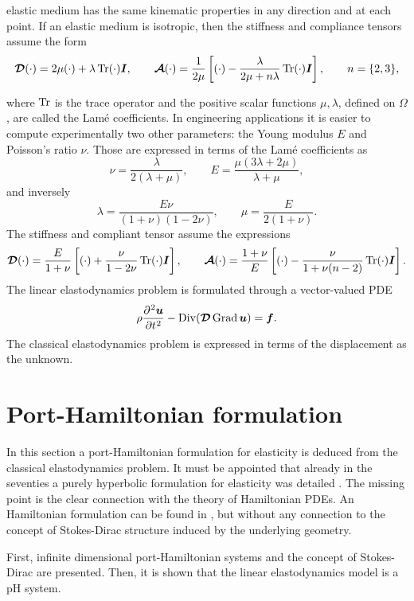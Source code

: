 elastic medium has the same kinematic properties in any direction and at each point. If an elastic medium is isotropic, then the stiffness and compliance tensors assume the form
\[
\bm{\mathcal{D}}(\cdot) = 2\mu (\cdot) + \lambda \operatorname{Tr}(\cdot)\bm{I}, \qquad \bm{\mathcal{A}}(\cdot) = \frac{1}{2\mu}\left[(\cdot) - \frac{\lambda}{2\mu + n\lambda}\operatorname{Tr}(\cdot)\bm{I}\right], \qquad n= \{2,3\},
\]

where  $\operatorname{Tr}$ is the trace operator and the positive scalar functions $\mu, \lambda$, defined on $\Omega$, are called the Lam\'e coefficients. In engineering applications it is easier to compute experimentally two other parameters: the Young modulus $E$ and  Poisson's ratio $\nu$. Those are expressed in terms of the Lam\'e  coefficients as 
\[
\nu =\frac{\lambda}{2(\lambda +\mu)}, \qquad 
E=\frac{\mu (3\lambda +2\mu)}{\lambda +\mu},
\]
and inversely
\[
\lambda =\frac {E\nu }{(1+\nu )(1-2\nu )}, \qquad
\mu = \frac{E}{2(1+\nu)}.
\]
The stiffness and compliant tensor assume the expressions
\[
\bm{\mathcal{D}}(\cdot) = \frac{E}{1+\nu} \left[(\cdot) + \frac{\nu}{1-2\nu}\operatorname{Tr}(\cdot)\bm{I}\right], \qquad \bm{\mathcal{A}}(\cdot) = \frac{1+\nu}{E}\left[(\cdot) - \frac{\nu}{1+\nu(n-2)}\operatorname{Tr}(\cdot)\bm{I}\right].
\]
The linear elastodynamics problem is formulated through a vector-valued PDE
\begin{equation}\label{eq:lin_elastodyn}
\rho \diffp[2]{\bm{u}}{t} - \Div(\bm{\mathcal{D}} \Grad \bm{u}) = \bm{f}.
\end{equation}  
The classical elastodynamics problem is expressed in terms of the displacement as the unknown. 

\section{Port-Hamiltonian formulation}

In this section a port-Hamiltonian formulation for elasticity is deduced from the classical elastodynamics problem. It must be appointed that already in the seventies a purely hyperbolic formulation for elasticity was detailed \cite{hughes1978classical}. The missing point is the clear connection with the theory of Hamiltonian PDEs. An Hamiltonian formulation can be found in \cite{grinfield2015}, but without any connection to the concept of Stokes-Dirac structure induced by the underlying geometry.

First, infinite dimensional port-Hamiltonian systems and the concept of Stokes-Dirac are presented. Then, it is shown that the linear elastodynamics model is a pH system.

